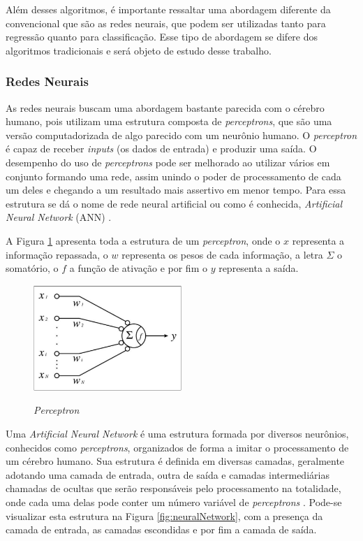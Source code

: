 Além desses algoritmos, é importante ressaltar uma abordagem diferente da convencional que são as redes neurais, que podem ser utilizadas tanto para regressão quanto para classificação. Esse tipo de abordagem se difere dos algoritmos tradicionais e será objeto de estudo desse trabalho.

\subsubsection{Redes Neurais}
\label{sec:redesneurais}

As redes neurais buscam uma abordagem bastante parecida com o cérebro humano, pois utilizam uma estrutura composta de \emph{perceptrons}, que são uma versão computadorizada de algo parecido com um neurônio humano. O \emph{perceptron} é capaz de receber \emph{inputs} (os dados de entrada) e produzir uma saída. O desempenho do uso de \emph{perceptrons} pode ser melhorado ao utilizar vários em conjunto formando uma rede, assim unindo o poder de processamento de cada um deles e chegando a um resultado mais assertivo em menor tempo. Para essa estrutura se dá o nome de rede neural artificial ou como é conhecida, \emph{Artificial Neural Network} (ANN) \cite{deepLearning, deepLearningTensorFlow}.

A Figura \ref{fig:perceptron} apresenta toda a estrutura de um \emph{perceptron}, onde o $x$ representa a informação repassada, o $w$ representa os pesos de cada informação, a letra $\Sigma$ o somatório, o $f$ a função de ativação e por fim o $y$ representa a saída.

\begin{figure}[!htb]
	\centering
	\caption{\emph{Perceptron}}
	\includegraphics[width=0.50\textwidth]{img/perceptron.jpg}
	\label{fig:perceptron}
\end{figure}

Uma \emph{Artificial Neural Network} é uma estrutura formada por diversos neurônios, conhecidos como \emph{perceptrons}, organizados de forma a imitar o processamento de um cérebro humano. Sua estrutura é definida em diversas camadas, geralmente adotando uma camada de entrada, outra de saída e camadas intermediárias chamadas de ocultas que serão responsáveis pelo processamento na totalidade, onde cada uma delas pode conter um número variável de \emph{perceptrons} \cite{deepLearningTensorFlow}. Pode-se visualizar esta estrutura na Figura \ref{fig:neuralNetwork}, com a presença da camada de entrada, as camadas escondidas e por fim a camada de saída.

